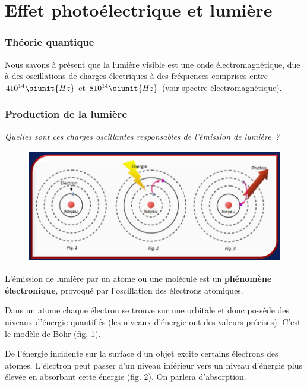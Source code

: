 \section{Effet photoélectrique et lumière}

\subsubsection*{Théorie quantique}

Nous savons à présent que la lumière visible est une onde
électromagnétique, due à des oscillations de charges électriques à des
fréquences comprises entre $4 10^{14} \siunit{Hz}$ et
$8 10^{14} \siunit{Hz} $
(voir spectre électromagnétique).

\subsubsection{Production de la lumière}

\emph{Quelles sont ces charges oscillantes responsables de l'émission de
lumière~?}

\begin{figure}
\centering
\includegraphics[width=11.557cm,height=4.957cm]{Pictures/100000010000035A00000170D87D5DDA82610A97.png}
\caption{}
\end{figure}

L'émission de lumière par un atome ou une molécule est un
\textbf{phénomène électronique},
provoqué par l'oscillation des électrons atomiques.

Dans un atome chaque électron se trouve sur une orbitale et donc possède
des niveaux d'énergie quantifiés (les niveaux d'énergie ont des valeurs
précises). C'est le modèle de Bohr (fig. 1).

De l'énergie incidente sur la surface d'un objet excite certains
électrons des atomes. L'électron peut passer d'un niveau inférieur vers
un niveau d'énergie plus élevée en absorbant cette énergie (fig. 2). On
parlera d'absorption.

